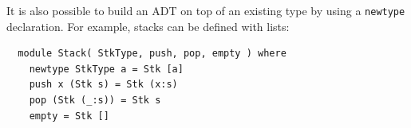 It is also possible to build an ADT on top of an existing type by
using a \mbox{\tt newtype} declaration.  For example, stacks can be defined
with lists: 
\bprog
{\small\begin{verbatim}
  module Stack( StkType, push, pop, empty ) where
    newtype StkType a = Stk [a]
    push x (Stk s) = Stk (x:s)
    pop (Stk (_:s)) = Stk s
    empty = Stk []
\end{verbatim}}
\eprogNoSkip




